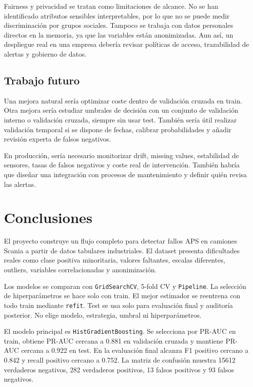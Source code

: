 \documentclass[11pt,a4paper]{article}
\begin{document}
Fairness y privacidad se tratan como limitaciones de alcance. No se han identificado atributos sensibles interpretables, por lo que no se puede medir discriminación por grupos sociales. Tampoco se trabaja con datos personales directos en la memoria, ya que las variables están anonimizadas. Aun así, un despliegue real en una empresa debería revisar políticas de acceso, trazabilidad de alertas y gobierno de datos.

\subsection{Trabajo futuro}

Una mejora natural sería optimizar coste dentro de validación cruzada en train. Otra mejora sería estudiar umbrales de decisión con un conjunto de validación interno o validación cruzada, siempre sin usar test. También sería útil realizar validación temporal si se dispone de fechas, calibrar probabilidades y añadir revisión experta de falsos negativos.

En producción, sería necesario monitorizar drift, missing values, estabilidad de sensores, tasas de falsos negativos y coste real de intervención. También habría que diseñar una integración con procesos de mantenimiento y definir quién revisa las alertas.

\section{Conclusiones}
\label{sec_conclusiones}

El proyecto construye un flujo completo para detectar fallos APS en camiones Scania a partir de datos tabulares industriales. El dataset presenta dificultades reales como clase positiva minoritaria, valores faltantes, escalas diferentes, outliers, variables correlacionadas y anonimización.

Los modelos se comparan con \texttt{GridSearchCV}, 5-fold CV y \texttt{Pipeline}. La selección de hiperparámetros se hace solo con train. El mejor estimador se reentrena con todo train mediante \texttt{refit}. Test se usa solo para evaluación final y auditoría posterior. No elige modelo, estrategia, umbral ni hiperparámetros.

El modelo principal es \texttt{HistGradientBoosting}. Se selecciona por PR-AUC en train, obtiene PR-AUC cercana a 0.881 en validación cruzada y mantiene PR-AUC cercana a 0.922 en test. En la evaluación final alcanza F1 positivo cercano a 0.842 y recall positivo cercano a 0.752. La matriz de confusión muestra 15612 verdaderos negativos, 282 verdaderos positivos, 13 falsos positivos y 93 falsos negativos.
\end{document}
